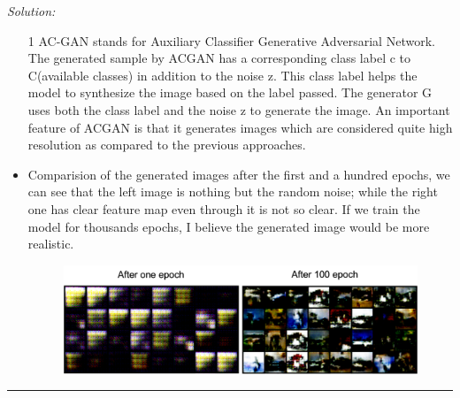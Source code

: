 \documentclass[a4paper, 11pt]{article}
\newenvironment{solution}
    {\textit{Solution:}}
    {}
\begin{document}
\begin{solution}
\begin{itemize}
\item[1] AC-GAN stands for Auxiliary Classifier Generative Adversarial Network. The generated sample by ACGAN has a corresponding class label c to C(available classes) in addition to the noise z. This class label helps the model to synthesize the image based on the label passed. The generator G uses both the class label and the noise z to generate the image. An important feature of ACGAN is that it generates images which are considered quite high resolution as compared to the previous approaches.
\item Comparision of the generated images after the first and a hundred epochs, we can see that the left image is nothing but the random noise; while the right one has clear feature map even through it is not so clear. If we train the model for thousands epochs, I believe the generated image would be more realistic.


\begin{figure}[H]
\centering    \includegraphics[scale=0.7]{AC-GAN.png}
    \label{fig:1-7}
\end{figure}


\end{itemize}
\end{solution}




\noindent\rule{7in}{2.8pt}
\end{document}
